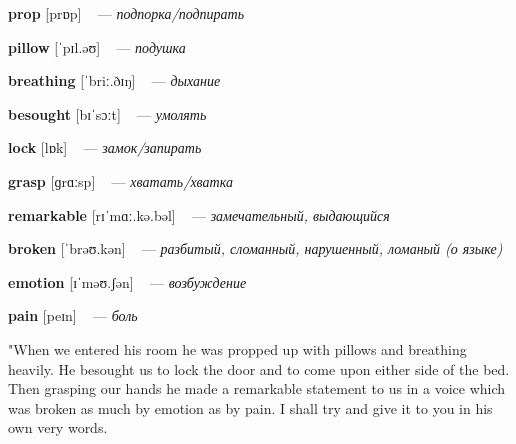 \documentclass[a4paper,oneside,12pt]{amsart}
\begin{document}
{\large 

 {\bf prop } [prɒp] ~ --- \emph{ подпорка/подпирать }

{\bf pillow } [ˈpɪl.əʊ] ~ --- \emph{ подушка }

{\bf breathing } [ˈbriː.ðɪŋ] ~ --- \emph{ дыхание }

{\bf besought } [bɪˈsɔːt] ~ --- \emph{ умолять }

{\bf lock } [lɒk] ~ --- \emph{ замок/запирать }

{\bf grasp } [ɡrɑːsp] ~ --- \emph{ хватать/хватка }

{\bf remarkable } [rɪˈmɑː.kə.bəl] ~ --- \emph{ замечательный, выдающийся }

{\bf broken } [ˈbrəʊ.kən] ~ --- \emph{ разбитый, сломанный, нарушенный, ломаный (о языке) }

{\bf emotion } [ɪˈməʊ.ʃən] ~ --- \emph{ возбуждение }

{\bf pain } [peɪn] ~ --- \emph{ боль }

} \vspace{6mm} {\Large 

 
"When we entered his room he was propped up with pillows and breathing heavily. He besought us to lock the door and to come upon either side of the bed. Then grasping our hands he made a remarkable statement to us in a voice which was broken as much by emotion as by pain. I shall try and give it to you in his own very words.
\\ } 
\end{document}
